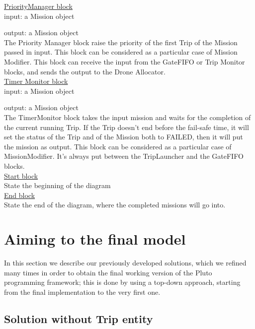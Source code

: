 \underline{PriorityManager block}
\\

input: a Mission object

output: a Mission object
\\

The Priority Manager block raise the priority of the first Trip of the Mission passed in input.
This block can be considered as a particular case of Mission Modifier. 
This block can receive the input from the GateFIFO or Trip Monitor blocks, and sends the output to the Drone Allocator.
\\

\underline{Timer Monitor block}
\\

input: a Mission object

output: a Mission object
\\

The TimerMonitor block takes the input mission and waits for the completion of the current running Trip. If the Trip doesn't end before the fail-safe time, it will set the status of the Trip and of the Mission both to FAILED, then it will put the mission as output.
This block can be considered as a particular case of MissionModifier.
It's always put between the TripLauncher and the GateFIFO blocks.
\\


\underline{Start block}
\\
State the beginning of the diagram
\\

\underline{End block}
\\
State the end of the diagram, where the completed missions will go into.
\\

\section{Aiming to the final model}\label{history}

In this section we describe our previously developed solutions, which we refined many times in order to obtain the final working version of the Pluto programming framework; this is done by using a top-down approach, starting from the final implementation to the very first one.

\subsection{Solution without Trip entity}

